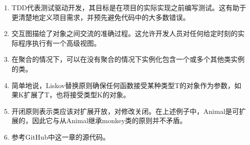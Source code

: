 \begin{enumerate}
	\item TDD代表测试驱动开发，其目标是在项目的实际实现之前编写测试。这有助于更清楚地定义项目需求，并预先避免代码中的大多数错误。
	\item 交互图描绘了对象之间交流的准确过程。这允许开发人员对任何给定时刻的实际程序执行有一个高级视图。
	\item 在聚合的情况下，可以在没有聚合的情况下实例化包含一个或多个其他类实例的类。
	\item 简单地说，Liskov替换原则确保任何函数接受某种类型T的对象作为参数，如果K扩展了T，也将接受类型K的对象。
	\item 开闭原则表示类应该对扩展开放，对修改关闭。在上述例子中，Animal是可扩展的，因此它与从Animal继承monkey类的原则并不矛盾。
	\item 参考GitHub中这一章的源代码。
\end{enumerate}












